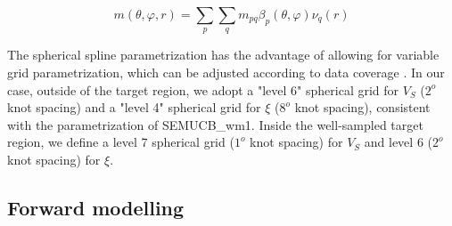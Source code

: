 \documentclass[12pt]{article}
\begin{document}
\begin{equation}
	m(\theta,\varphi,r) = \sum_{p}\sum_{q}m_{pq}\beta_{p}(\theta,\varphi)\nu_{q}(r)
\end{equation}

The spherical spline parametrization has the advantage of allowing for variable grid parametrization, which can be adjusted according to data coverage \citep[e.g.][]{marone2007three}. 
In our case, outside of the target region, we adopt a "level 6" spherical grid for $V_{S}$ ($2^{o}$ knot spacing) and a "level 4" spherical grid for $\xi$ ($8^{o}$ knot spacing), consistent with the parametrization of SEMUCB\_wm1. Inside the well-sampled target region, we define a level 7 spherical grid ($1^{o}$ knot spacing) for $V_{S}$ and level 6 ($2^{o}$ knot spacing) for $\xi$. 

 \subsection{Forward modelling}
\end{document}
